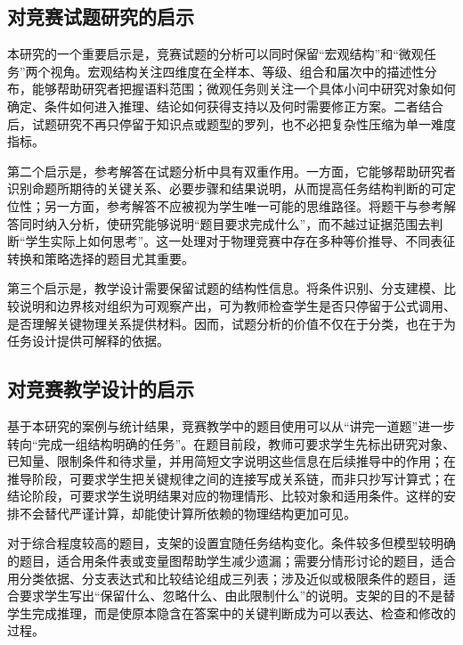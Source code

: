 \documentclass[
  12pt,
  a4paper,twoside,openany]{ctexbook}
\begin{document}
\subsection{对竞赛试题研究的启示}\label{ux5bf9ux7adeux8d5bux8bd5ux9898ux7814ux7a76ux7684ux542fux793a}

本研究的一个重要启示是，竞赛试题的分析可以同时保留``宏观结构''和``微观任务''两个视角。宏观结构关注四维度在全样本、等级、组合和届次中的描述性分布，能够帮助研究者把握语料范围；微观任务则关注一个具体小问中研究对象如何确定、条件如何进入推理、结论如何获得支持以及何时需要修正方案。二者结合后，试题研究不再只停留于知识点或题型的罗列，也不必把复杂性压缩为单一难度指标。

第二个启示是，参考解答在试题分析中具有双重作用。一方面，它能够帮助研究者识别命题所期待的关键关系、必要步骤和结果说明，从而提高任务结构判断的可定位性；另一方面，参考解答不应被视为学生唯一可能的思维路径。将题干与参考解答同时纳入分析，使研究能够说明``题目要求完成什么''，而不越过证据范围去判断``学生实际上如何思考''。这一处理对于物理竞赛中存在多种等价推导、不同表征转换和策略选择的题目尤其重要。

第三个启示是，教学设计需要保留试题的结构性信息。将条件识别、分支建模、比较说明和边界核对组织为可观察产出，可为教师检查学生是否只停留于公式调用、是否理解关键物理关系提供材料。因而，试题分析的价值不仅在于分类，也在于为任务设计提供可解释的依据。

\subsection{对竞赛教学设计的启示}\label{ux5bf9ux7adeux8d5bux6559ux5b66ux8bbeux8ba1ux7684ux542fux793a}

基于本研究的案例与统计结果，竞赛教学中的题目使用可以从``讲完一道题''进一步转向``完成一组结构明确的任务''。在题目前段，教师可要求学生先标出研究对象、已知量、限制条件和待求量，并用简短文字说明这些信息在后续推导中的作用；在推导阶段，可要求学生把关键规律之间的连接写成关系链，而非只抄写计算式；在结论阶段，可要求学生说明结果对应的物理情形、比较对象和适用条件。这样的安排不会替代严谨计算，却能使计算所依赖的物理结构更加可见。

对于综合程度较高的题目，支架的设置宜随任务结构变化。条件较多但模型较明确的题目，适合用条件表或变量图帮助学生减少遗漏；需要分情形讨论的题目，适合用分类依据、分支表达式和比较结论组成三列表；涉及近似或极限条件的题目，适合要求学生写出``保留什么、忽略什么、由此限制什么''的说明。支架的目的不是替学生完成推理，而是使原本隐含在答案中的关键判断成为可以表达、检查和修改的过程。
\end{document}
